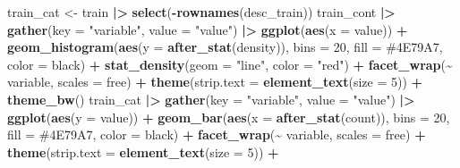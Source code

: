 \documentclass[
]{article}
\newenvironment{Shaded}{\begin{snugshade}}{\end{snugshade}}
\newcommand{\AttributeTok}[1]{\textcolor[rgb]{0.13,0.29,0.53}{#1}}
\newcommand{\DecValTok}[1]{\textcolor[rgb]{0.00,0.00,0.81}{#1}}
\newcommand{\FunctionTok}[1]{\textcolor[rgb]{0.13,0.29,0.53}{\textbf{#1}}}
\newcommand{\NormalTok}[1]{#1}
\newcommand{\OtherTok}[1]{\textcolor[rgb]{0.56,0.35,0.01}{#1}}
\newcommand{\SpecialCharTok}[1]{\textcolor[rgb]{0.81,0.36,0.00}{\textbf{#1}}}
\newcommand{\StringTok}[1]{\textcolor[rgb]{0.31,0.60,0.02}{#1}}
\begin{document}
\begin{Shaded}
\begin{Highlighting}[]
\NormalTok{train\_cat }\OtherTok{\textless{}{-}}
\NormalTok{  train }\SpecialCharTok{|\textgreater{}}
  \FunctionTok{select}\NormalTok{(}\SpecialCharTok{{-}}\FunctionTok{rownames}\NormalTok{(desc\_train))}
\NormalTok{train\_cont }\SpecialCharTok{|\textgreater{}}
  \FunctionTok{gather}\NormalTok{(}\AttributeTok{key =} \StringTok{"variable"}\NormalTok{, }\AttributeTok{value =} \StringTok{"value"}\NormalTok{) }\SpecialCharTok{|\textgreater{}}  
  \FunctionTok{ggplot}\NormalTok{(}\FunctionTok{aes}\NormalTok{(}\AttributeTok{x =}\NormalTok{ value)) }\SpecialCharTok{+} 
  \FunctionTok{geom\_histogram}\NormalTok{(}\FunctionTok{aes}\NormalTok{(}\AttributeTok{y =} \FunctionTok{after\_stat}\NormalTok{(density)), }\AttributeTok{bins =} \DecValTok{20}\NormalTok{, }\AttributeTok{fill =} \StringTok{\textquotesingle{}\#4E79A7\textquotesingle{}}\NormalTok{, }\AttributeTok{color =} \StringTok{\textquotesingle{}black\textquotesingle{}}\NormalTok{) }\SpecialCharTok{+} 
  \FunctionTok{stat\_density}\NormalTok{(}\AttributeTok{geom =} \StringTok{"line"}\NormalTok{, }\AttributeTok{color =} \StringTok{"red"}\NormalTok{) }\SpecialCharTok{+}
  \FunctionTok{facet\_wrap}\NormalTok{(}\SpecialCharTok{\textasciitilde{}}\NormalTok{ variable, }\AttributeTok{scales =} \StringTok{\textquotesingle{}free\textquotesingle{}}\NormalTok{) }\SpecialCharTok{+}
  \FunctionTok{theme}\NormalTok{(}\AttributeTok{strip.text =} \FunctionTok{element\_text}\NormalTok{(}\AttributeTok{size =} \DecValTok{5}\NormalTok{)) }\SpecialCharTok{+}
  \FunctionTok{theme\_bw}\NormalTok{()}
\NormalTok{train\_cat }\SpecialCharTok{|\textgreater{}}
  \FunctionTok{gather}\NormalTok{(}\AttributeTok{key =} \StringTok{"variable"}\NormalTok{, }\AttributeTok{value =} \StringTok{"value"}\NormalTok{) }\SpecialCharTok{|\textgreater{}}  
  \FunctionTok{ggplot}\NormalTok{(}\FunctionTok{aes}\NormalTok{(}\AttributeTok{y =}\NormalTok{ value)) }\SpecialCharTok{+} 
  \FunctionTok{geom\_bar}\NormalTok{(}\FunctionTok{aes}\NormalTok{(}\AttributeTok{x =} \FunctionTok{after\_stat}\NormalTok{(count)), }\AttributeTok{bins =} \DecValTok{20}\NormalTok{, }\AttributeTok{fill =} \StringTok{\textquotesingle{}\#4E79A7\textquotesingle{}}\NormalTok{, }\AttributeTok{color =} \StringTok{\textquotesingle{}black\textquotesingle{}}\NormalTok{) }\SpecialCharTok{+}
  \FunctionTok{facet\_wrap}\NormalTok{(}\SpecialCharTok{\textasciitilde{}}\NormalTok{ variable, }\AttributeTok{scales =} \StringTok{\textquotesingle{}free\textquotesingle{}}\NormalTok{) }\SpecialCharTok{+}
  \FunctionTok{theme}\NormalTok{(}\AttributeTok{strip.text =} \FunctionTok{element\_text}\NormalTok{(}\AttributeTok{size =} \DecValTok{5}\NormalTok{)) }\SpecialCharTok{+}

\end{Highlighting}
\end{Shaded}
\end{document}
